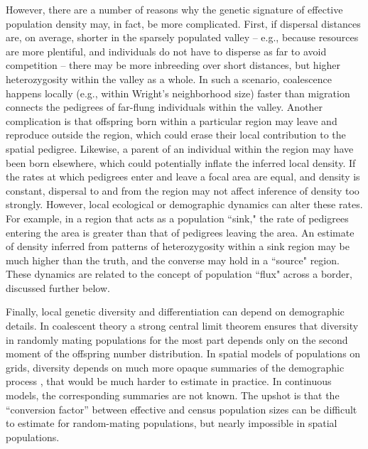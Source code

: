 \documentclass{ar-1col}
\newcommand{\g}[1]{{\color{blue}{#1}}}
\begin{document}
However, there are a number of reasons why the genetic signature 
of effective population density may, in fact, be more complicated.
First, if dispersal distances are, on average, shorter 
in the sparsely populated valley -- 
e.g., because resources are more plentiful, 
and individuals do not have to disperse as far to avoid competition -- 
there may be more inbreeding over short distances, 
but higher heterozygosity within the valley as a whole.
In such a scenario, coalescence happens locally 
(e.g., within Wright's neighborhood size)
faster than migration connects the pedigrees of 
far-flung individuals within the valley.
Another complication is that offspring born within a particular region 
may leave and reproduce outside the region, 
which could erase their local contribution to the spatial pedigree.
Likewise, a parent of an individual within the region 
may have been born elsewhere, 
which could potentially inflate the inferred local density.
If the rates at which pedigrees enter and leave a focal area are equal, 
and density is constant, 
dispersal to and from the region may not affect inference of density too strongly.
However, local ecological or demographic dynamics 
can alter these rates.
For example, in a region that acts as a population ``sink,"
the rate of pedigrees entering the area is greater than 
that of pedigrees leaving the area.
An estimate of density inferred from patterns of heterozygosity 
within a sink region may be much higher than the truth, 
and the converse may hold in a ``source" region.
These dynamics are related to the concept of population ``flux" 
across a border, discussed further below.
\g{mention boundary effects?}

Finally, local genetic diversity and differentiation
can depend on demographic details.
In coalescent theory a strong central limit theorem
ensures that diversity in randomly mating populations 
for the most part depends only on the second moment of the offspring number distribution.
In spatial models of populations on grids,
diversity depends on much more opaque summaries of the demographic process
\citep{wright_ibd, sawyer1977, rousset1997},
that would be much harder to estimate in practice.
In continuous models, the corresponding summaries are not known.
The upshot is that the ``conversion factor'' between effective and census population sizes
can be difficult to estimate for random-mating populations,
but nearly impossible in spatial populations.
\end{document}
